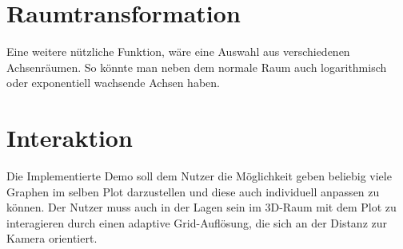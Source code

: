 \section{Raumtransformation}
Eine weitere nützliche Funktion, wäre eine Auswahl aus verschiedenen Achsenräumen.
So könnte man neben dem normale Raum auch logarithmisch oder exponentiell wachsende Achsen haben.

\section{Interaktion}
Die Implementierte Demo soll dem Nutzer die Möglichkeit geben beliebig viele Graphen im selben Plot darzustellen und diese auch individuell anpassen zu können.
Der Nutzer muss auch in der Lagen sein im 3D-Raum mit dem Plot zu interagieren durch einen adaptive Grid-Auflösung, die sich an der Distanz zur Kamera orientiert.

